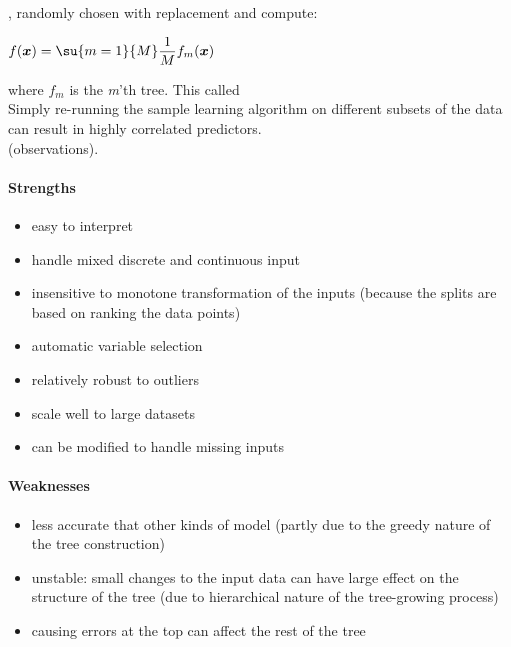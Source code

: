 , randomly chosen with replacement and compute:
\begin{center}
    $f(\bm{x}) = \su{m=1}{M}\dfrac{1}{M}f_{m}(\bm{x})$
\end{center}
where $f_{m}$ is the \emph{m}'th tree. This called \\
Simply re-running the sample learning algorithm on different subsets of the data can
result in highly correlated predictors.\\
 (observations). 




 


\paragraph{Strengths}
\begin{itemize}
    \item easy to interpret
    \item handle mixed discrete and continuous input
    \item insensitive to monotone transformation of the inputs (because the splits
        are based on ranking the data points)
    \item automatic variable selection 
    \item relatively robust to outliers
    \item scale well to large datasets
    \item can be modified to handle missing inputs
\end{itemize}


\paragraph{Weaknesses}
\begin{itemize}
    \item less accurate that other kinds of model (partly due to the greedy nature of
        the tree construction)
    \item unstable: small changes to the input data can have large effect on the 
        structure of the tree (due to hierarchical nature of the tree-growing process)
    \item causing errors at the top can affect the rest of the tree
\end{itemize}

